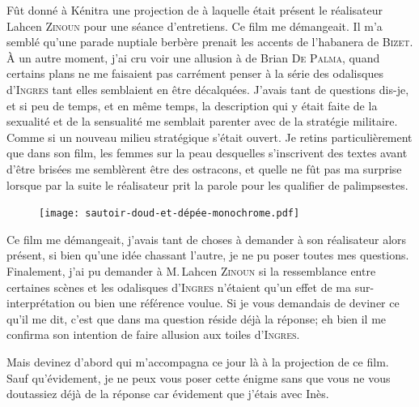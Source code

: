 \begin{prose}
Fût donné à Kénitra une projection de  à laquelle était présent le réalisateur Lahcen \textsc{Zinoun} pour une séance d’entretiens. Ce film me démangeait. Il m’a semblé qu’une parade nuptiale berbère prenait les accents de l’habanera  de \textsc{Bizet}. À un autre moment, j’ai cru voir une allusion à  de Brian \textsc{De Palma}, quand certains plans ne me faisaient pas carrément penser à la série des odalisques d’\textsc{Ingres} tant elles semblaient en être décalquées. J’avais tant de questions dis-je, et si peu de temps, et en même temps, la description qui y était faite de la sexualité et de la sensualité me semblait parenter avec de la stratégie militaire. Comme si un nouveau milieu stratégique s’était ouvert. Je retins particulièrement que dans son film, les femmes sur la peau desquelles s’inscrivent des textes avant d’être brisées me semblèrent être des ostracons, et quelle ne fût pas ma surprise lorsque par la suite le réalisateur prit la parole pour les qualifier de palimpsestes.

\begin{figure}[h]
\centering
\texttt{[image: sautoir-doud-et-dépée-monochrome.pdf]}
\captionsetup{labelformat=empty}
\caption[Oud et épée ulfberht passés en sautoir]{}
\end{figure}

Ce film me démangeait, j’avais tant de choses à demander à son réalisateur alors présent, si bien qu’une idée chassant l’autre, je ne pu poser toutes mes questions. Finalement, j’ai pu demander à M.\,Lahcen \textsc{Zinoun} si la ressemblance entre certaines scènes et les odalisques d’\textsc{Ingres} n’étaient qu’un effet de ma sur-interprétation ou bien une référence voulue. Si je vous demandais de deviner ce qu’il me dit, c’est que dans ma question réside déjà la réponse; eh bien il me confirma son intention de faire allusion aux toiles d’\textsc{Ingres}.

Mais devinez d’abord qui m’accompagna ce jour là à la projection de ce film. Sauf qu’évidement, je ne peux vous poser cette énigme sans que vous ne vous doutassiez déjà de la réponse car évidement que j’étais avec Inès.
\end{prose}

